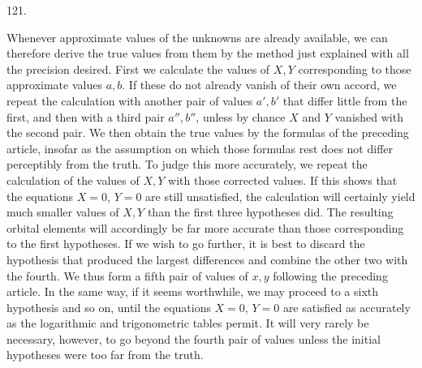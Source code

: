 \par{}\medskip
\begin{center}\hypertarget{native-168-article121}{}121.\end{center}
Whenever approximate values of the unknowns are already available, we can therefore derive the true values from them by the method just explained with all the precision desired. First we calculate the values of $X,Y$ corresponding to those approximate values $a,b$. If these do not already vanish of their own accord, we repeat the calculation with another pair of values $a',b'$ that differ little from the first, and then with a third pair $a'',b''$, unless by chance $X$ and $Y$ vanished with the second pair. We then obtain the true values by the formulas of the preceding article, insofar as the assumption on which those formulas rest does not differ perceptibly from the truth. To judge this more accurately, we repeat the calculation of the values of $X,Y$ with those corrected values. If this shows that the equations $X=0$, $Y=0$ are still unsatisfied, the calculation will certainly yield much smaller values of $X,Y$ than the first three hypotheses did. The resulting orbital elements will accordingly be far more accurate than those corresponding to the first hypotheses. If we wish to go further, it is best to discard the hypothesis that produced the largest differences and combine the other two with the fourth. We thus form a fifth pair of values of $x,y$ following the preceding article. In the same way, if it seems worthwhile, we may proceed to a sixth hypothesis and so on, until the equations $X=0$, $Y=0$ are satisfied as accurately as the logarithmic and trigonometric tables permit. It will very rarely be necessary, however, to go beyond the fourth pair of values unless the initial hypotheses were too far from the truth.
